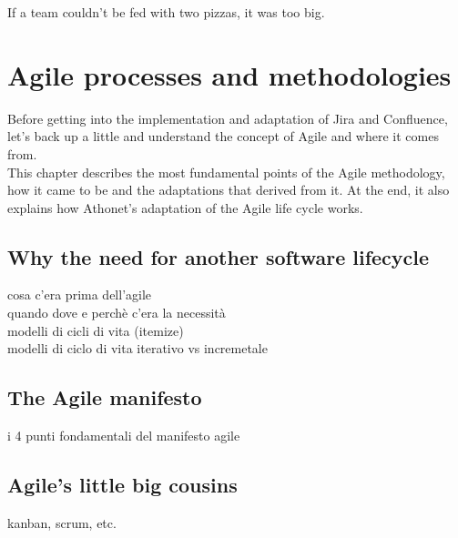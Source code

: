 \begin{savequote}[75mm]
If a team couldn’t be fed with two pizzas, it was too big.
\end{savequote}




\chapter{Agile processes and methodologies}

Before getting into the implementation and adaptation of Jira and Confluence, let's back up a little and understand the concept of Agile and where it comes from.\\
This chapter describes the most fundamental points of the Agile methodology, how it came to be and the adaptations that derived from it.
At the end, it also explains how Athonet's adaptation of the Agile life cycle works.

\section{Why the need for another software lifecycle}
	cosa c'era prima dell'agile\\
	quando dove e perchè c'era la necessità\\
	modelli di cicli di vita (itemize)\\
	modelli di ciclo di vita iterativo vs incremetale


\section{The Agile manifesto}
	i 4 punti fondamentali del manifesto agile

\section{Agile's little big cousins}
	kanban, scrum, etc.
	


